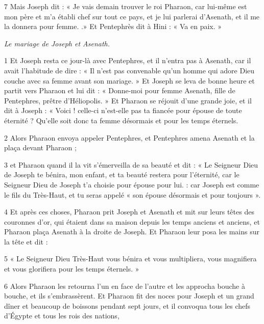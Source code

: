 \par 7 Mais Joseph dit : « Je vais demain trouver le roi Pharaon, car lui-même est mon père et m'a établi chef sur tout ce pays, et je lui parlerai d'Asenath, et il me la donnera pour femme. .» Et Pentephrès dit à Hini : « Va en paix. »


\par \textit{Le mariage de Joseph et Asenath.}

\par 1 Et Joseph resta ce jour-là avec Pentephres, et il n'entra pas à Asenath, car il avait l'habitude de dire : « Il n'est pas convenable qu'un homme qui adore Dieu couche avec sa femme avant son mariage. » Et Joseph se leva de bonne heure et partit vers Pharaon et lui dit : « Donne-moi pour femme Asenath, fille de Pentephres, prêtre d'Héliopolis. » Et Pharaon se réjouit d'une grande joie, et il dit à Joseph : « Voici ! celle-ci n'est-elle pas ta fiancée pour épouse de toute éternité ? Qu'elle soit donc ta femme désormais et pour les temps éternels.

\par 2 Alors Pharaon envoya appeler Pentephres, et Pentephres amena Asenath et la plaça devant Pharaon ;

\par 3 et Pharaon quand il la vit s'émerveilla de sa beauté et dit : « Le Seigneur Dieu de Joseph te bénira, mon enfant, et ta beauté restera pour l'éternité, car le Seigneur Dieu de Joseph t'a choisie pour épouse pour lui. : car Joseph est comme le fils du Très-Haut, et tu seras appelé « son épouse désormais et pour toujours ».

\par 4 Et après ces choses, Pharaon prit Joseph et Asenath et mit sur leurs têtes des couronnes d'or, qui étaient dans sa maison depuis les temps anciens et anciens, et Pharaon plaça Asenath à la droite de Joseph. Et Pharaon leur posa les mains sur la tête et dit :

\par 5 « Le Seigneur Dieu Très-Haut vous bénira et vous multipliera, vous magnifiera et vous glorifiera pour les temps éternels. »

\par 6 Alors Pharaon les retourna l'un en face de l'autre et les approcha bouche à bouche, et ils s'embrassèrent. Et Pharaon fit des noces pour Joseph et un grand dîner et beaucoup de boissons pendant sept jours, et il convoqua tous les chefs d'Égypte et tous les rois des nations,

